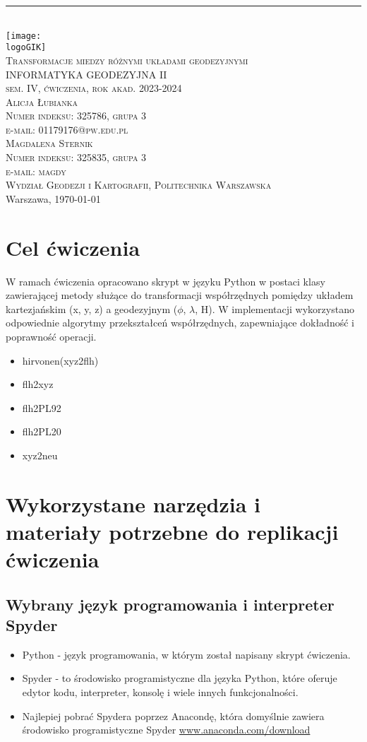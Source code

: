 \documentclass[10pt,a4paper]{article}
\makeatletter
\newcommand{\logoGIK}{WGiK-znak.png}
\newcommand{\authorName}{Alicja Łubianka \\ Numer indeksu: 325786, grupa 3 \\ e-mail: 01179176@pw.edu.pl\\ Magdalena Sternik \\ Numer indeksu: 325835, grupa 3 \\ e-mail: magdy}
\newcommand{\titeReport}{Transformacje miedzy różnymi układami geodezyjnymi} %
\newcommand{\titleLecture}{INFORMATYKA GEODEZYJNA II\\ sem. IV, ćwiczenia, rok akad. 2023-2024} %
\newcommand{\faculty}{Wydział Geodezji i Kartografii}
\newcommand{\university}{Politechnika Warszawska}
\newcommand{\city}{Warszawa}
\makeatother
\begin{document}
	\begin{center} 
		\rule{\textwidth}{.5pt} \\
		\vspace{1.0cm}
		\texttt{[image: \\logoGIK]}
		\vspace{0.5cm} \\
		\Large \textsc{\titeReport}
		\vspace{0.5cm} \\  
		\large \textsc{\titleLecture}
		\vspace{0.5cm}\\
		\textsc{\authorName}  \\
		\textsc{\faculty}, \textsc{\university}  \\ 
		\city, \today
	\end{center}
	\newpage
	\tableofcontents
	\newpage
	\section{Cel ćwiczenia}
	W ramach ćwiczenia opracowano skrypt w języku Python w postaci klasy zawierającej metody służące do transformacji współrzędnych pomiędzy układem kartezjańskim (x, y, z) a geodezyjnym ($\phi$, $\lambda$, H). W implementacji wykorzystano odpowiednie algorytmy przekształceń współrzędnych, zapewniające dokładność i poprawność operacji.
	\begin{itemize}
		\item hirvonen(xyz2flh)
		\item flh2xyz
		\item flh2PL92
		\item flh2PL20
		\item xyz2neu 
		
	\end{itemize}
	\section{Wykorzystane narzędzia i materiały potrzebne do replikacji ćwiczenia}
	
	\subsection{Wybrany język programowania i interpreter Spyder}
	
	\begin{itemize}
		\item 
		Python - język programowania, w którym został napisany skrypt ćwiczenia.
		\item Spyder - to środowisko programistyczne dla języka Python, które oferuje edytor kodu, interpreter, konsolę i wiele innych funkcjonalności.
		\item Najlepiej pobrać Spydera poprzez Anacondę, która domyślnie zawiera środowisko programistyczne Spyder \href{https://www.anaconda.com/download}{www.anaconda.com/download}	\citep{Anaconda}
	\end{itemize}
	
\end{document}
